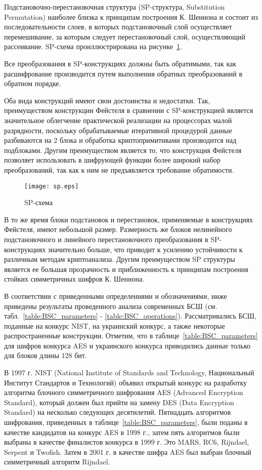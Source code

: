 Подстановочно-перестановочная структура (SP-структура, Substitution Permutation)
наиболее близка к принципам построения К. Шеннона и состоит из
последовательности слоев, в которых подстановочный слой осуществляет
перемешивание, за которым следует перестановочный слой, осуществляющий
рассеивание. SP-схема проиллюстрирована на рисунке~\ref{fig:SP}.

Все преобразования в SP-конструкциях должны быть обратимыми, так как
расшифрование производится путем выполнения обратных преобразований в обратном
порядке.

Оба вида  конструкций имеют свои достоинства и недостатки. Так, преимуществом
конструкции Фейстеля в сравнении с SP-конструкцией является значительное
облегчение практической реализации на процессорах малой разрядности, поскольку
обрабатываемые итеративной процедурой данные разбиваются на 2 блока и обработка
криптопримитивами производится над подблоками. Другим преимуществом является то,
что конструкция Фейстеля позволяет использовать в шифрующей функции более
широкий набор преобразований, так как к ним не предъявляется требование
обратимости.

\begin{figure}
    \centering\texttt{[image: sp.eps]}
    \caption{SP-схема}
    \label{fig:SP}
\end{figure}

В то же время блоки подстановок и перестановок, применяемые в конструкциях
Фейстеля, имеют небольшой размер. Размерность же блоков нелинейного
подстановочного и линейного перестановочного преобразования в SP-конструкциях
значительно больше, что приводит к усилению устойчивости к различным методам
криптоанализа. Другим преимуществом SP структуры является ее большая
прозрачность и приближенность к принципам построения стойких симметричных шифров
К. Шеннона.

В соответствии с приведенными определениями и обозначениями, ниже приведены
результаты проведенного анализа современных БСШ (см.
табл.~\ref{table:BSC_parameters} - \ref{table:BSC_operations}). Рассматривались
БСШ, поданные на конкурс  NIST, на украинский конкурс, а также некоторые
распространенные конструкции. Отметим, что в таблице~\ref{table:BSC_parameters}
для шифров конкурса AES и украинского конкурса приводились данные только для
блоков длины 128 бит.

В 1997 г. NIST (National Institute of Standards and Technology, Национальный
Институт Стандартов и Технологий) объявил открытый конкурс на разработку
алгоритма блочного симметричного шифрования AES (Advanced Encryption Standard),
который должен был прийти на замену  DES (Data Encryption Standard) на несколько
следующих десятилетий. Пятнадцать алгоритмов шифрования, приведенных в
таблице~\ref{table:BSC_parameters}, были поданы в качестве кандидатов на конкурс
AES в 1998 г., затем пять алгоритмов были выбраны в качестве финалистов конкурса
в 1999 г.  Это MARS, RC6, Rijndael, Serpent и Twofish. Затем в 2001 г. в
качестве шифра AES был выбран блочный симметричный алгоритм Rijndael.

